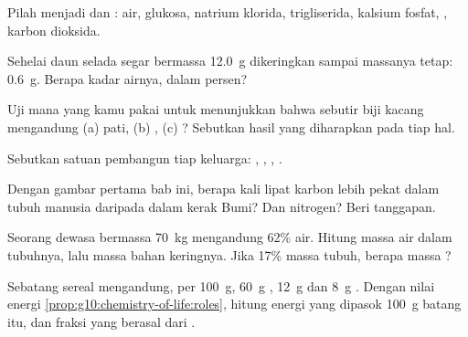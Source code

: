 \begin{exercise}[$\star$]\label{exo:g10:chemistry-of-life:2}
Pilah menjadi  dan : air, glukosa, natrium
klorida, trigliserida, kalsium fosfat, , karbon
dioksida.
\end{exercise}

\begin{exercise}[$\star$]\label{exo:g10:chemistry-of-life:3}
Sehelai daun selada segar bermassa \qty{12.0}{g} dikeringkan sampai
massanya tetap: \qty{0.6}{g}. Berapa kadar airnya, dalam persen?
\end{exercise}

\begin{exercise}[$\star$]\label{exo:g10:chemistry-of-life:4}
Uji mana yang kamu pakai untuk menunjukkan bahwa sebutir biji kacang
mengandung (a) pati, (b) , (c) ? Sebutkan hasil yang diharapkan pada tiap hal.
\end{exercise}

\begin{exercise}[$\star$]\label{exo:g10:chemistry-of-life:5}
Sebutkan satuan pembangun tiap keluarga: , ,
, .
\end{exercise}

\begin{exercise}[$\star\star$]\label{exo:g10:chemistry-of-life:6}
Dengan gambar pertama bab ini, berapa kali lipat karbon lebih pekat
dalam tubuh manusia daripada dalam kerak Bumi? Dan nitrogen?
Beri tanggapan.
\end{exercise}

\begin{exercise}[$\star\star$]\label{exo:g10:chemistry-of-life:7}
Seorang dewasa bermassa \qty{70}{kg} mengandung 62\% air. Hitung massa
air dalam tubuhnya, lalu massa bahan keringnya. Jika  17\%
massa tubuh, berapa massa ?
\end{exercise}

\begin{exercise}[$\star\star$]\label{exo:g10:chemistry-of-life:8}
Sebatang sereal mengandung, per \qty{100}{g}, \qty{60}{g} ,
\qty{12}{g}  dan \qty{8}{g} . Dengan nilai energi
\cref{prop:g10:chemistry-of-life:roles}, hitung energi yang dipasok
\qty{100}{g} batang itu, dan fraksi yang berasal dari
.
\end{exercise}

